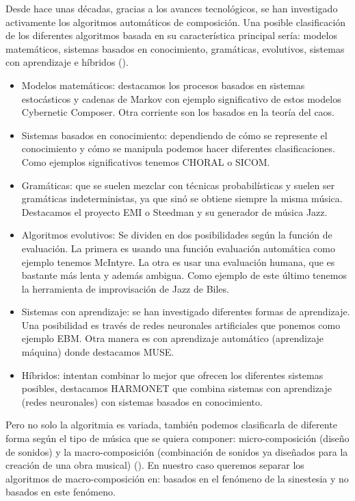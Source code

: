 Desde hace unas décadas, gracias a los avances tecnológicos, se han investigado activamente los algoritmos automáticos de composición. Una posible clasificación de los diferentes algoritmos basada en su característica principal sería: modelos matemáticos, sistemas basados en conocimiento, gramáticas, evolutivos, sistemas con aprendizaje e híbridos (\cite{AIMethodsForComposition}). \\
\color{blue} 
\begin{itemize}
	\item Modelos matemáticos: destacamos los procesos basados en sistemas estocásticos y cadenas de Markov con ejemplo significativo de estos modelos Cybernetic Composer. Otra corriente son los basados en la teoría del caos.
	\item Sistemas basados en conocimiento: dependiendo de cómo se represente el conocimiento y cómo se manipula podemos hacer diferentes clasificaciones. Como ejemplos significativos tenemos CHORAL o SICOM.
	\item Gramáticas: que se suelen mezclar con técnicas probabilísticas y suelen ser gramáticas indeterministas, ya que sinó se obtiene siempre la misma música. Destacamos el proyecto EMI o Steedman y su generador de música Jazz.
	\item Algoritmos evolutivos: Se dividen en dos posibilidades según la función de evaluación. La primera es usando una función evaluación automática como ejemplo tenemos McIntyre. La otra es usar una evaluación humana, que es bastante más lenta y además ambigua. Como ejemplo de este último tenemos la herramienta de improvisación de Jazz de Biles.
	\item Sistemas con aprendizaje: se han investigado diferentes formas de aprendizaje. Una posibilidad es través de redes neuronales artificiales que ponemos como ejemplo EBM. Otra manera es con aprendizaje automático (aprendizaje máquina) donde destacamos MUSE.
	\item Híbridos: intentan combinar lo mejor que ofrecen los diferentes sistemas posibles, destacamos HARMONET que combina sistemas con aprendizaje (redes neuronales) con sistemas basados en conocimiento.\\
\end{itemize}
\color{black}

Pero no solo la algoritmia es variada, también podemos clasificarla de diferente forma según el tipo de música que se quiera componer: micro-composición (diseño de sonidos) y la macro-composición (combinación de sonidos ya diseñados para la creación de una obra musical) (\cite{AudioVisualSurvey}). \color{blue} En nuestro caso queremos separar los algoritmos de macro-composición en: basados en el fenómeno de la sinestesia y no basados en este fenómeno.\\ \color{black}

